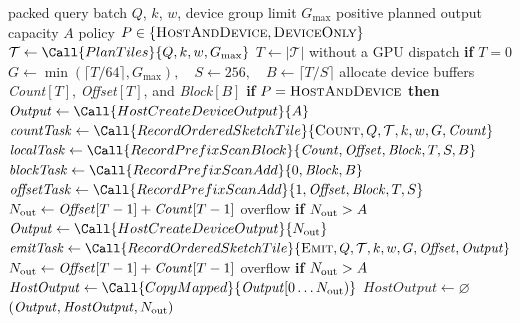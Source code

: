 \begin{algorithm}[H]
\caption{Vulkan scheduling in BioseqDB}
\label{alg:vulkan-sketch-host-schedule}
\footnotesize
\begin{algorithmic}[1]
  \Require packed query batch $Q$, $k$, $w$, device group limit $G_{\max}$
  \Require positive planned output capacity $A$
  \Require policy $P\in\{\textsc{HostAndDevice},\textsc{DeviceOnly}\}$
  \State $\mathcal T\gets\Call{PlanTiles}{Q,k,w,G_{\max}}$
  \State $T\gets|\mathcal T|$
  \State \Return without a GPU dispatch \textbf{if} $T=0$
  \State $G\gets\min(\lceil T/64\rceil,G_{\max}),\quad S\gets256,
         \quad B\gets\lceil T/S\rceil$
  \State {}
  \State allocate device buffers \emph{Count}$[T]$, \emph{Offset}$[T]$,
         and \emph{Block}$[B]$
  \State \textbf{if} $P=\textsc{HostAndDevice}$ \textbf{then}
         $\mathit{Output}\gets\Call{HostCreateDeviceOutput}{A}$
  \State {}
  \State {}
  \State $\mathit{countTask}\gets
         \Call{RecordOrderedSketchTile}{\textsc{Count},Q,\mathcal T,k,w,G,
                                        \mathit{Count}}$
  \State {}
  \State $\mathit{localTask}\gets
         \Call{RecordPrefixScanBlock}{\mathit{Count},\mathit{Offset},
                                      \mathit{Block},T,S,B}$
  \State {}
  \State $\mathit{blockTask}\gets
         \Call{RecordPrefixScanAdd}{0,\mathit{Block},B}$
  \State {}
  \State $\mathit{offsetTask}\gets
         \Call{RecordPrefixScanAdd}{1,\mathit{Offset},\mathit{Block},T,S}$
    \State {}
    \State $N_{\rm out}\gets
           \mathit{Offset}[T-1]+\mathit{Count}[T-1]$
    \State \Return overflow \textbf{if} $N_{\rm out}>A$
    \State $\mathit{Output}\gets\Call{HostCreateDeviceOutput}{N_{\rm out}}$
    \State {}
    \State {}
  \EndIf
  \State {}
  \State $\mathit{emitTask}\gets
         \Call{RecordOrderedSketchTile}{\textsc{Emit},Q,\mathcal T,k,w,G,
                                        \mathit{Offset},\mathit{Output}}$
  \State {}
    \State $N_{\rm out}\gets
           \mathit{Offset}[T-1]+\mathit{Count}[T-1]$
    \State \Return overflow \textbf{if} $N_{\rm out}>A$
    \State $\mathit{HostOutput}\gets
           \Call{CopyMapped}{\mathit{Output}[0\ldots N_{\rm out})}$
  \Else
    \State $\mathit{HostOutput}\gets\varnothing$
  \EndIf
  \State \Return $(\mathit{Output},\mathit{HostOutput},N_{\rm out})$
\end{algorithmic}
\end{algorithm}

